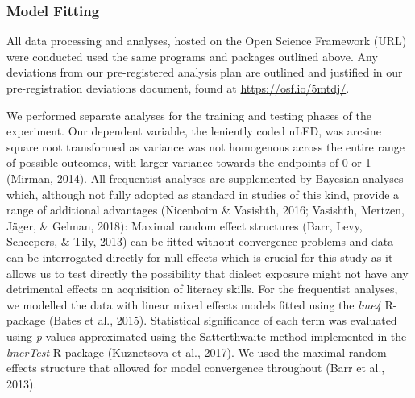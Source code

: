 \documentclass[doc,floatsintext]{apa6}
\begin{document}
\subsubsection{Model Fitting}\label{model-fitting}

All data processing and analyses, hosted on the Open Science Framework
(URL) were conducted used the same programs and packages outlined above.
Any deviations from our pre-registered analysis plan are outlined and
justified in our pre-registration deviations document, found at
\url{https://osf.io/5mtdj/}.

We performed separate analyses for the training and testing phases of
the experiment. Our dependent variable, the leniently coded nLED, was
arcsine square root transformed as variance was not homogenous across
the entire range of possible outcomes, with larger variance towards the
endpoints of 0 or 1 (Mirman, 2014). All frequentist analyses are
supplemented by Bayesian analyses which, although not fully adopted as
standard in studies of this kind, provide a range of additional
advantages (Nicenboim \& Vasishth, 2016; Vasishth, Mertzen, Jäger, \&
Gelman, 2018): Maximal random effect structures (Barr, Levy, Scheepers,
\& Tily, 2013) can be fitted without convergence problems and data can
be interrogated directly for null-effects which is crucial for this
study as it allows us to test directly the possibility that dialect
exposure might not have any detrimental effects on acquisition of
literacy skills. For the frequentist analyses, we modelled the data with
linear mixed effects models fitted using the \emph{lme4} R-package
(Bates et al., 2015). Statistical significance of each term was
evaluated using \emph{p}-values approximated using the Satterthwaite
method implemented in the \emph{lmerTest} R-package (Kuznetsova et al.,
2017). We used the maximal random effects structure that allowed for
model convergence throughout (Barr et al., 2013).
\end{document}
